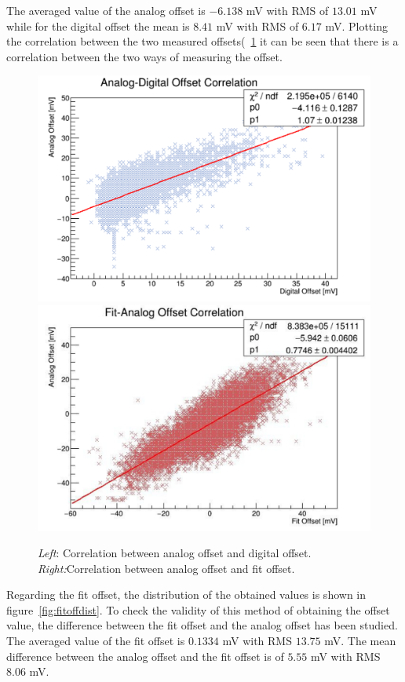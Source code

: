 \documentclass[main.tex]{subfiles}
\begin{document}
The averaged value of the analog offset is $-6.138 $ mV with RMS of $13.01 $ mV while for the digital offset the mean is $8.41$ mV with RMS of $6.17 $ mV. Plotting the correlation between the two measured offsets(~\ref{fig:offsetcor} it can be seen that there is a correlation between the two ways of measuring the offset.
\begin{figure}
  \centering
  \includegraphics[width=\textwidth]{./Pictures/offsetscor.pdf}
  \endminipage
  \includegraphics[width=\textwidth]{./Pictures/fitanalogcor.pdf}
  \endminipage
  \caption{\textit{Left}: Correlation between analog offset and digital offset. \textit{Right:}Correlation between analog offset and fit offset.}
  \label{fig:offsetcor}
\end{figure}
Regarding the fit offset, the distribution of the obtained values is shown in figure~\ref{fig:fitoffdist}. To check the validity of this method of obtaining the offset value, the difference between the fit offset and the analog offset has been studied. The averaged value of the fit offset is $0.1334$ mV  with RMS $13.75$ mV. The mean difference between the analog offset and the fit offset is of $5.55$ mV with RMS $8.06$ mV.
\end{document}

